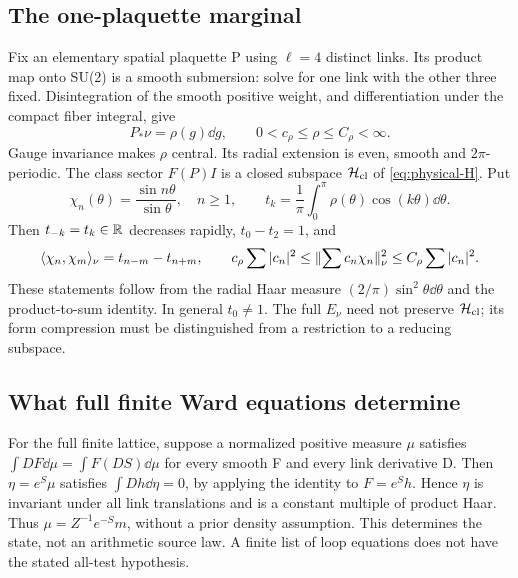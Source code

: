 \subsection{The one-plaquette marginal}
Fix an elementary spatial plaquette P using $\ell=4$ distinct links.
Its product map onto SU(2) is a smooth submersion: solve for one link
with the other three fixed. Disintegration of the smooth positive
weight, and differentiation under the compact fiber integral, give
\begin{equation}\label{eq:marginal}
P_*\nu=\rho(g)\dd g,\qquad
0<c_\rho\le\rho\le C_\rho<\infty.
\end{equation}
Gauge invariance makes $\rho$ central. Its radial extension is even,
smooth and $2\pi$-periodic. The class sector $F(P)I$ is a closed
subspace $\mathcal H_{\rm cl}$ of \eqref{eq:physical-H}. Put
\begin{equation}
\chi_n(\theta)=\frac{\sin n\theta}{\sin\theta},\quad n\ge1,
\qquad t_k=\frac1\pi\int_0^\pi\rho(\theta)\cos(k\theta)\dd\theta.
\end{equation}
Then $t_{-k}=t_k\in\mathbb R$ decreases rapidly, $t_0-t_2=1$, and
\begin{equation}\label{eq:gram}
\langle \chi_n,\chi_m\rangle_\nu=t_{n-m}-t_{n+m},\qquad
c_\rho\sum|c_n|^2\le\lVert \sum c_n\chi_n\rVert_\nu^2
                       \le C_\rho\sum|c_n|^2.
\end{equation}
These statements follow from the radial Haar measure
$(2/\pi)\sin^2\theta\dd\theta$ and the product-to-sum identity.
In general $t_0\ne1$. The full $E_\nu$ need not preserve
$\mathcal H_{\rm cl}$; its form compression must be distinguished from a
restriction to a reducing subspace.

\subsection{What full finite Ward equations determine}
For the full finite lattice, suppose a normalized positive measure
$\mu$ satisfies
$\int DF\dd\mu=\int F(DS)\dd\mu$ for every smooth F and every
link derivative D. Then $\eta=e^S\mu$ satisfies $\int Dh\dd\eta=0$,
by applying the identity to $F=e^S h$. Hence $\eta$ is invariant under
all link translations and is a constant multiple of product Haar.
Thus $\mu=Z^{-1}e^{-S}m$, without a prior density assumption.
This determines the state, not an arithmetic source law. A finite list
of loop equations does not have the stated all-test hypothesis.

